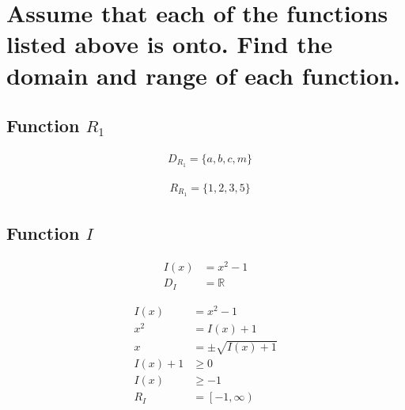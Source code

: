 \documentclass[12pt, letterpaper]{article}
\begin{document}
    \newpage
    \section{Assume that each of the functions listed above is onto. Find the domain and range of each function.}

        \subsection{Function \(R_1\)}
        \vspace{-2pt}
        \begin{minipage}{0.5\textwidth}
            \begin{align*}
                & D_{R_1} = \{a, b, c, m\}
            \end{align*}
        \end{minipage}
        \begin{minipage}{0.5\textwidth}
            \begin{align*}
                & R_{R_1} = \{1, 2, 3, 5\}
            \end{align*}
        \end{minipage}
        
        \subsection{Function \(I\)}
        \vspace{-2pt}
        \begin{minipage}{0.5\textwidth}
            \begin{align*}
                I(x) &= x^2 - 1 \\
                D_{I} &= \mathbb{R}
            \end{align*}
        \end{minipage}
        \begin{minipage}{0.5\textwidth}
            \begin{align*}
                I(x) &= x^2 - 1 \\
                x^2 &= I(x) + 1 \\
                x &= \pm\sqrt{I(x) + 1} \\
                I(x) + 1 &\geq 0 \\
                I(x) &\geq -1 \\
                R_{I} &= \left[-1, \infty\right)
            \end{align*}
        \end{minipage}
\end{document}

